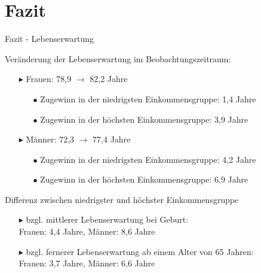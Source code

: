 \documentclass{beamer}
\begin{document}
\section{Fazit}
\begin{frame}{Fazit - Lebenserwartung}
	\begin{block}{Veränderung der Lebenserwartung im Beobachtungszeitraum:}
		\begin{itemize}
			\item[$\blacktriangleright$] Frauen: 78,9 $\rightarrow$ 82,2 Jahre\\
			\begin{itemize}
			\item[$\bullet$] Zugewinn in der niedrigsten Einkommensgruppe: 1,4 Jahre
			\item[$\bullet$]Zugewinn in der höchsten Einkommensgruppe: 3,9 Jahre
			\end{itemize}								
			\item[$\blacktriangleright$] Männer: 72,3 $\rightarrow$ 77,4 Jahre
			\begin{itemize}
				\item[$\bullet$] Zugewinn in der niedrigsten Einkommensgruppe: 4,2 Jahre
				\item[$\bullet$] Zugewinn in der höchsten Einkommensgruppe: 6,9 Jahre
			\end{itemize}
		\end{itemize}
	\end{block}
	\pause
	\begin{block}{Differenz zwischen niedrigster und höchster Einkommensgruppe}
		\begin{itemize}
			\item[$\blacktriangleright$] bzgl. mittlerer Lebenserwartung bei Geburt:\\ Frauen: 4,4 Jahre, Männer: 8,6 Jahre
			\item[$\blacktriangleright$] bzgl. fernerer Lebenserwartung ab einem Alter von 65 Jahren:\\ Frauen: 3,7 Jahre, Männer: 6,6 Jahre
		\end{itemize}
	\end{block}
\end{frame}
\end{document}

